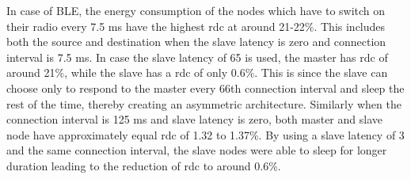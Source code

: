 In case of BLE, the energy consumption of the nodes which have to switch on their radio every 7.5 ms have the highest \gls{rdc} at around 21-22\%. This includes both the source and destination when the slave latency is zero and connection interval is 7.5 ms. In case the slave latency of 65 is used, the master has \gls{rdc} of around 21\%, while the slave has a \gls{rdc} of only 0.6\%. This is since the slave  can choose only to respond to the master every 66th connection interval and sleep the rest of the time, thereby creating an asymmetric architecture. Similarly when the connection interval is 125 ms and slave latency is zero, both master and slave node have 
approximately equal \gls{rdc} of 1.32 to 1.37\%. By using a slave latency of 3 and the same connection interval, the slave nodes were able to sleep for longer duration leading to the reduction of \gls{rdc} to around 0.6\%.